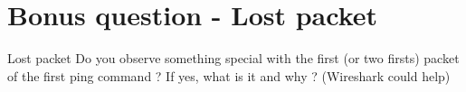 \section{Bonus question - Lost packet}

\begin{bonusQuestionBox}{Lost packet}
    Do you observe something special with the first (or two firsts) packet of the first ping command ? If yes, what is it and why ? (Wireshark could help)
\end{bonusQuestionBox}
